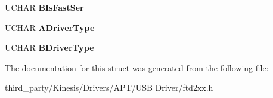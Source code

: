 \begin{DoxyCompactItemize}
\item 
U\+C\+H\+AR {\bfseries B\+Is\+Fast\+Ser}\hypertarget{structft__eeprom__2232_a33a65a0fbacf825f9af5903b834b9ab2}{}\label{structft__eeprom__2232_a33a65a0fbacf825f9af5903b834b9ab2}

\item 
U\+C\+H\+AR {\bfseries A\+Driver\+Type}\hypertarget{structft__eeprom__2232_ad86a60a990160e5976e563365b7d05d0}{}\label{structft__eeprom__2232_ad86a60a990160e5976e563365b7d05d0}

\item 
U\+C\+H\+AR {\bfseries B\+Driver\+Type}\hypertarget{structft__eeprom__2232_a74407077c9097bf480f560b0511daf79}{}\label{structft__eeprom__2232_a74407077c9097bf480f560b0511daf79}

\end{DoxyCompactItemize}


The documentation for this struct was generated from the following file\+:\begin{DoxyCompactItemize}
\item 
third\+\_\+party/\+Kinesis/\+Drivers/\+A\+P\+T/\+U\+S\+B Driver/ftd2xx.\+h\end{DoxyCompactItemize}
